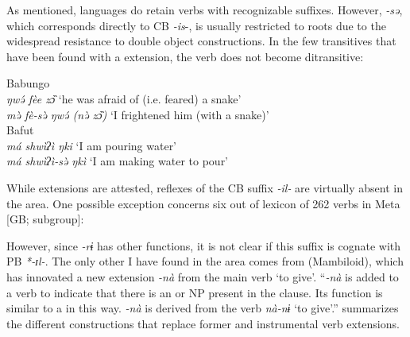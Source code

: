 \documentclass[output=paper]{langsci/langscibook}
\begin{document}
As mentioned,  languages do retain verbs with recognizable  suffixes. However,  \textit{-sə}, which corresponds directly to CB \textit{-is}-, is usually restricted to  roots due to the widespread resistance to double object constructions. In the few transitives that have been found with a  extension, the verb does not become ditransitive:
    
\ea
\label{ex:hyman:14}
\ea 
Babungo \\ 
\textit{ŋw\'{ə} fèe zɔ̏                    }  ‘he was afraid of (i.e. feared) a snake’\\
\textit{m\`{ə} fè-s\`{ə} ŋw\'{ə} (n\`ə zɔ̏)}  ‘I frightened him (with a snake)’\\
\citep[211]{Schaub1985}
\ex 
Bafut \\
\textit{má shwìʔì ŋki}  ‘I am pouring water’\\
\textit{má shwìʔì-s\`ə ŋkì}   ‘I am making water to pour’\\
\citep[102]{Bila1986}
\z 
\z 

  While  extensions are attested, reflexes of the CB  suffix \textit{-il-} are virtually absent in the  area. One possible exception concerns six out of  lexicon of 262 verbs in Meta [GB;  subgroup]:
 

\noindent
However, since \textit{-rɨ} has other functions, it is not clear if this suffix is cognate with PB  \textit{*-ɪl-}. The only other  I have found in the area comes from  (Mambiloid), which has innovated a new extension \textit{-nà} from the main verb ‘to give’.
 “\textit{-nà} is added to a verb to indicate that there is an  or  NP present in the clause. Its function is similar to a   in this way. \textit{-nà} is derived from the verb \textit{nà-nɨ} ‘to give’.” \citep[8]{Thwing2006}
   summarizes the different constructions that replace former  and instrumental verb extensions.
\end{document}
